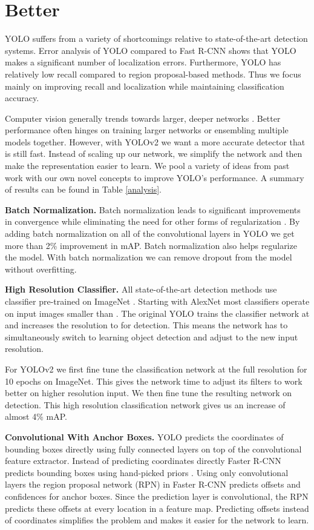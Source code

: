 \documentclass[10pt,twocolumn,letterpaper]{article}
\begin{document}
\section{Better}

YOLO suffers from a variety of shortcomings relative to state-of-the-art detection systems. Error analysis of YOLO compared to Fast R-CNN shows that YOLO makes a significant number of localization errors. Furthermore, YOLO has relatively low recall compared to region proposal-based methods. Thus we focus mainly on improving recall and localization while maintaining classification accuracy.

Computer vision generally trends towards larger, deeper networks \cite{resnet} \cite{inception} \cite{vgg}. Better performance often hinges on training larger networks or ensembling multiple models together. However, with YOLOv2 we want a more accurate detector that is still fast. Instead of scaling up our network, we simplify the network and then make the representation easier to learn. We pool a variety of ideas from past work with our own novel concepts to improve YOLO's performance. A summary of results can be found in Table \ref{analysis}.

\textbf{Batch Normalization.} Batch normalization leads to significant improvements in convergence while eliminating the need for other forms of regularization \cite{batch}. By adding batch normalization on all of the convolutional layers in YOLO we get more than 2\% improvement in mAP. Batch normalization also helps regularize the model. With batch normalization we can remove dropout from the model without overfitting.

\textbf{High Resolution Classifier.} All state-of-the-art detection methods use classifier pre-trained on ImageNet \cite{ILSVRC15}. Starting with AlexNet most classifiers operate on input images smaller than  \cite{alexnet}. The original YOLO trains the classifier network at  and increases the resolution to  for detection. This means the network has to simultaneously switch to learning object detection and adjust to the new input resolution.

For YOLOv2 we first fine tune the classification network at the full  resolution for 10 epochs on ImageNet. This gives the network time to adjust its filters to work better on higher resolution input. We then fine tune the resulting network on detection. This high resolution classification network gives us an increase of almost 4\% mAP.
   
\textbf{Convolutional With Anchor Boxes.} YOLO predicts the coordinates of bounding boxes directly using fully connected layers on top of the convolutional feature extractor. Instead of predicting coordinates directly Faster R-CNN predicts bounding boxes using hand-picked priors \cite{ren2015faster}. Using only convolutional layers the region proposal network (RPN) in Faster R-CNN predicts offsets and confidences for anchor boxes. Since the prediction layer is convolutional, the RPN predicts these offsets at every location in a feature map. Predicting offsets instead of coordinates simplifies the problem and makes it easier for the network to learn.
\end{document}
